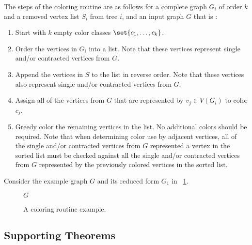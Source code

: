 The steps of the coloring routine are as follows for a complete graph \(G_i\) of order \(k\) and a removed vertex
list \(S_i\) from tree \(i\), and an input graph \(G\) that is :
\begin{enumerate}
\item Start with \(k\) empty color classes \(\set{c_1,\ldots,c_k}\).
\item Order the vertices in \(G_i\) into a list.  Note that these vertices represent single and/or contracted
  vertices from \(G\).
\item Append the vertices in \(S\) to the list in reverse order.  Note that these vertices also represent
  single and/or contracted vertices from \(G\).
\item Assign all of the vertices from \(G\) that are represented by \(v_j\in V(G_i)\) to color \(c_j\).
\item Greedy color the remaining vertices in the list.  No additional colors should be required.  Note that when
  determining color use by adjacent vertices, all of the single and/or contracted vertices from \(G\) represented a
  vertex in the sorted list must be checked against all the single and/or contracted vertices from \(G\)
  represented by the previously colored vertices in the sorted list.
\end{enumerate}

Consider the example graph \(G\) and its reduced form \(G_1\) in \figurename~\ref{fig:crex}.

\begin{figure}[H]
  \begin{minipage}{2.5in}
    \centering
    \begin{tikzpicture}[every node/.style={labeled node}]
    \end{tikzpicture}

    \(G\)
  \end{minipage}
  \begin{minipage}{2.5in}
    \centering
    \begin{tikzpicture}[every node/.style={labeled node}]
    \end{tikzpicture}
  \end{minipage}
  \caption{A coloring routine example.}
  \label{fig:crex}
\end{figure}

\subsection{Supporting Theorems}\label{sec:sub:theorems}

